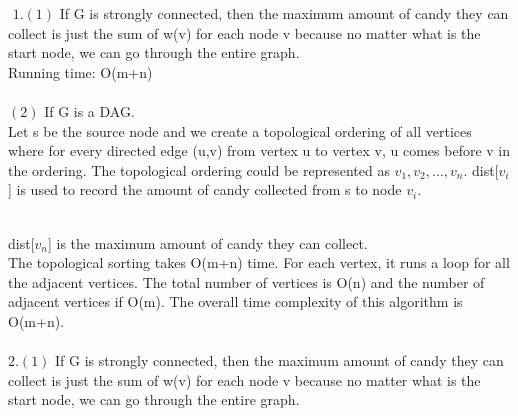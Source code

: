 \documentclass[11pt]{article}
\begin{document}
\begin{solution}
$ $
$1.(1)$ If G is strongly connected, then the maximum amount of candy they can collect is just the sum of w(v) for each node v because no matter what is the start node, we can go through the entire graph. \\
Running time: O(m+n) \\\\
$(2)$ If G is a DAG. \\
Let s be the source node and we create a topological ordering of all vertices where for every directed edge (u,v) from vertex u to vertex v, u comes before v in the ordering. The topological ordering could be represented as $v_1,v_2,...,v_n$. dist[$v_i$] is used to record the amount of candy collected from s to node $v_i$.
\begin{quote}
        \newline
\end{quote} \\
dist[$v_n$] is the maximum amount of candy they can collect.\\
The topological sorting takes O(m+n) time. For each vertex, it runs a loop for all the adjacent vertices. The total number of vertices is O(n) and the number of adjacent vertices if O(m). The overall time complexity of this algorithm is O(m+n). \\\\
$2.(1)$ If G is strongly connected, then the maximum amount of candy they can collect is just the sum of w(v) for each node v because no matter what is the start node, we can go through the entire graph. \\

\end{solution}
\end{document}

